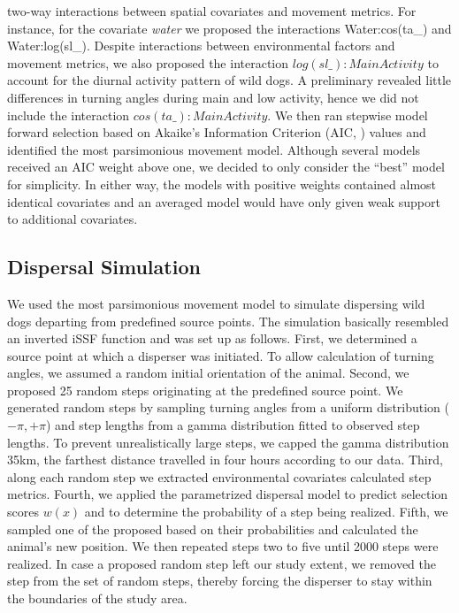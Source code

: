\documentclass[abstract=on,10pt,a4paper,bibliography=totocnumbered]{article}
\begin{document}
two-way interactions between spatial covariates and movement metrics. For
instance, for the covariate \textit{water} we proposed the interactions
Water:cos(ta\_) and Water:log(sl\_). Despite interactions between environmental
factors and movement metrics, we also proposed the interaction
\(log(sl\_):MainActivity\) to account for the diurnal activity pattern of wild
dogs. A preliminary revealed little differences in turning angles during main
and low activity, hence we did not include the interaction
\(cos(ta\_):MainActivity\). We then ran stepwise model forward selection based
on Akaike's Information Criterion (AIC, \citealp{Burnham.2002}) values and
identified the most parsimonious movement model. Although several models
received an AIC weight above one, we decided to only consider the  ``best''
model for simplicity. In either way, the models with positive weights contained
almost identical covariates and an averaged model would have only given weak
support to additional covariates.

\subsection{Dispersal Simulation}
We used the most parsimonious movement model to simulate dispersing wild dogs
departing from predefined source points. The simulation basically resembled an
inverted iSSF function and was set up as follows. First, we determined a source
point at which a disperser was initiated. To allow calculation of turning
angles, we assumed a random initial orientation of the animal. Second, we
proposed 25 random steps originating at the predefined source point. We
generated random steps by sampling turning angles from a uniform distribution
(\(-\pi, +\pi\)) and step lengths from a gamma distribution fitted to observed
step lengths. To prevent unrealistically large steps, we capped the gamma
distribution 35km, the farthest distance travelled in four hours according to
our data. Third, along each random step we extracted environmental covariates
calculated step metrics. Fourth, we applied the parametrized dispersal model to
predict selection scores \(w(x)\) and to determine the probability of a step
being realized. Fifth, we sampled one of the proposed based on their
probabilities and calculated the animal's new position. We then repeated steps
two to five until 2000 steps were realized. In case a proposed random step left
our study extent, we removed the step from the set of random steps, thereby
forcing the disperser to stay within the boundaries of the study area.
\end{document}
